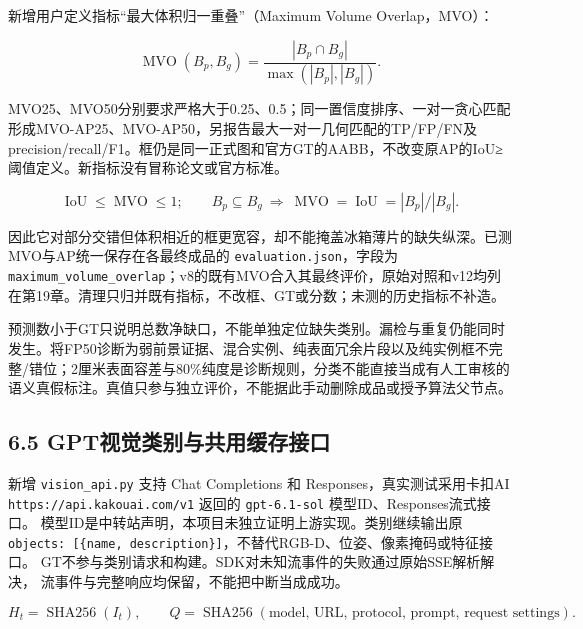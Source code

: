 \documentclass[UTF8,fontset=fandol]{ctexart}
\begin{document}
新增用户定义指标“最大体积归一重叠”（Maximum Volume Overlap，MVO）：



\[
\operatorname{MVO}(B_p,B_g)=\frac{|B_p\cap B_g|}{\max(|B_p|,|B_g|)}.
\]

MVO25、MVO50分别要求严格大于0.25、0.5；同一置信度排序、一对一贪心匹配形成MVO-AP25、MVO-AP50，另报告最大一对一几何匹配的TP/FP/FN及precision/recall/F1。框仍是同一正式图和官方GT的AABB，不改变原AP的IoU≥阈值定义。新指标没有冒称论文或官方标准。



\[
\operatorname{IoU}\le\operatorname{MVO}\le1;\qquad
B_p\subseteq B_g\ \Longrightarrow\ \operatorname{MVO}=\operatorname{IoU}=|B_p|/|B_g|.
\]

因此它对部分交错但体积相近的框更宽容，却不能掩盖冰箱薄片的缺失纵深。已测MVO与AP统一保存在各最终成品的 \texttt{evaluation.\allowbreak{}json}，字段为 \texttt{maximum\_\allowbreak{}volume\_\allowbreak{}overlap}；v8的既有MVO合入其最终评价，原始对照和v12均列在第19章。清理只归并既有指标，不改框、GT或分数；未测的历史指标不补造。



预测数小于GT只说明总数净缺口，不能单独定位缺失类别。漏检与重复仍能同时发生。将FP50诊断为弱前景证据、混合实例、纯表面冗余片段以及纯实例框不完整/错位；2厘米表面容差与80\%纯度是诊断规则，分类不能直接当成有人工审核的语义真假标注。真值只参与独立评价，不能据此手动删除成品或授予算法父节点。



\subsection*{6.5 GPT视觉类别与共用缓存接口}

新增 \texttt{vision\_\allowbreak{}api.\allowbreak{}py} 支持 Chat Completions 和 Responses，真实测试采用卡扣AI
\texttt{https:\allowbreak{}/\allowbreak{}/\allowbreak{}api.\allowbreak{}kakouai.\allowbreak{}com/\allowbreak{}v1} 返回的 \texttt{gpt-6.\allowbreak{}1-sol} 模型ID、Responses流式接口。
模型ID是中转站声明，本项目未独立证明上游实现。类别继续输出原
\texttt{objects:\allowbreak{} [\{name, description\}]}，不替代RGB-D、位姿、像素掩码或特征接口。
GT不参与类别请求和构建。SDK对未知流事件的失败通过原始SSE解析解决，
流事件与完整响应均保留，不能把中断当成成功。



\[
H_t=\operatorname{SHA256}(I_t),\qquad
Q=\operatorname{SHA256}(\text{model, URL, protocol, prompt, request settings}).
\]
\end{document}
